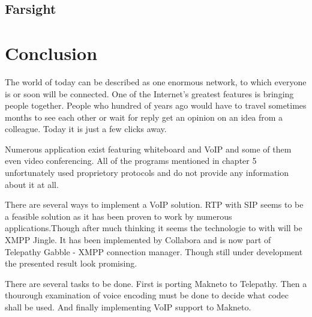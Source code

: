 \section{Farsight}


\chapter{Conclusion}
The world of today can be described as one enormous network, to which everyone is or soon will be connected. One of the Internet's greatest features is bringing people together. People who hundred of years ago would have to travel sometimes months to see each other or wait for reply get an opinion on an idea from a colleague. Today it is just a few clicks away.

Numerous application exist featuring whiteboard and VoIP and some of them even video conferencing. All of the programs mentioned in chapter 5 unfortunately used proprietory protocols and do not provide any information about it at all. 

There are several ways to implement a VoIP solution. RTP with SIP seems to be a feasible solution as it has been proven to work by numerous applications.Though after much thinking it seems the technologie to with will be XMPP Jingle. It has been implemented by Collabora and is now part of Telepathy Gabble - XMPP connection manager. Though still under development the presented result look promising.

There are several tasks to be done. First is porting Makneto to Telepathy. Then a thourough examination of voice encoding must be done to decide what codec shall be used. And finally implementing VoIP support to Makneto.   



